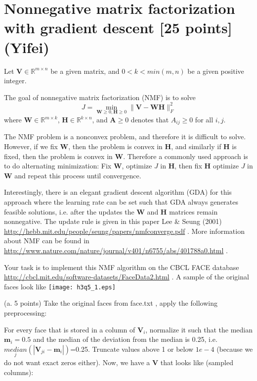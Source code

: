 


\section{Nonnegative matrix factorization with gradient descent [25 points] (Yifei)}

 Let $\mathbf{V} \in \mathbb{R}^{m\times n}$ be a given matrix, and $0<k<min(m,n)$ be a given positive integer.
 
 The goal of nonnegative matrix factorization (NMF) is to solve
 \begin{equation}
 \label{eq:nmf}
 J=\min_{\mathbf{W} \geq 0, \mathbf{H}\geq 0}\|\mathbf{V} - \mathbf{WH}\|^2_F
 \end{equation}
 where  $\mathbf{W}\in \mathbb{R}^{m\times k}$, $\mathbf{H} \in \mathbb{R}^{k \times n}$, and $\mathbf{A}\geq 0$ denotes that $A_{ij} \geq 0$ for all $i,j$.
 
 The NMF problem is a nonconvex problem, and therefore it is difficult to solve. 
 However, if we fix $\mathbf{W}$, then the problem is convex in $\mathbf{H}$, and similarly if $\mathbf{H}$ is fixed, then the problem is convex in $\mathbf{W}$. Therefore a commonly used approach is to do alternating minimization:
 Fix $\mathbf{W}$, optimize $J$ in $\mathbf{H}$, then fix $\mathbf{H}$ optimize $J$ in $\mathbf{W}$ and repeat this process until convergence. 
 
 Interestingly, there is an elegant gradient descent algorithm (GDA) for this approach where the learning rate can be set such that GDA always generates feasible solutions, i.e. after the updates the $\mathbf{W}$ and $\mathbf{H}$ matrices remain nonnegative.
  The update rule is given in this paper Lee \& Seung (2001)
 \url{http://hebb.mit.edu/people/seung/papers/nmfconverge.pdf} .
More information about NMF can be found in
\url{http://www.nature.com/nature/journal/v401/n6755/abs/401788a0.html} .

Your task is to implement this NMF algorithm on the CBCL FACE database 
\url{http://cbcl.mit.edu/software-datasets/FaceData2.html} . A sample of the original faces look like 
%
\texttt{[image: h3q5\_1.eps]}

(a. 5 points) Take the original faces from face.txt , apply the following preprocessing: 

For every face that is stored in a column of $\mathbf{V}_i$, normalize it such that the median $\mathbf{m}_i=0.5$ and the median of the deviation from the median is 0.25, i.e. $\underset{j}{median}(|\mathbf{V}_{ji}-\mathbf{m}_i|)$=0.25. Truncate values above 1 or below $1e-4$ (because we do not want exact zeros either). Now, we have a $\mathbf{V}$ that looks like (sampled columns): 

